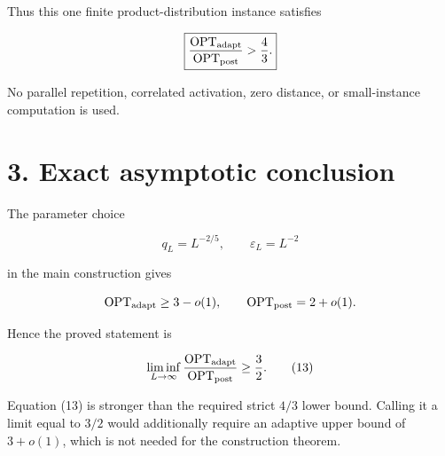 \documentclass[11pt,a4paper]{article}
\begin{document}
Thus this one finite product-distribution instance satisfies


\[
 \boxed{\displaystyle
 \frac{\operatorname{OPT}_{\rm adapt}}
      {\operatorname{OPT}_{\rm post}}>\frac43.}
\]

No parallel repetition, correlated activation, zero distance, or small-instance computation is used.


\section*{3. Exact asymptotic conclusion}

The parameter choice


\[
 q_L=L^{-2/5},\qquad \varepsilon_L=L^{-2}
\]

in the main construction gives


\[
 \operatorname{OPT}_{\rm adapt}\ge3-o(1),
 \qquad
 \operatorname{OPT}_{\rm post}=2+o(1).
\]

Hence the proved statement is


\begin{equation}
 \liminf_{L\to\infty}
 \frac{\operatorname{OPT}_{\rm adapt}}
      {\operatorname{OPT}_{\rm post}}
 \ge\frac32.
\tag{13}
\end{equation}

Equation (13) is stronger than the required strict \(4/3\) lower bound. Calling it a limit equal to \(3/2\) would additionally require an adaptive upper bound of \(3+o(1)\), which is not needed for the construction theorem.
\end{document}
